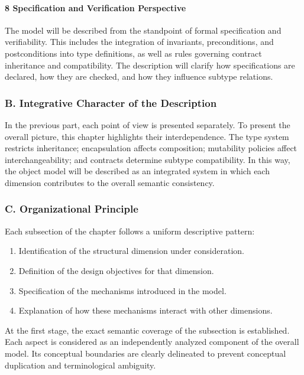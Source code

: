 \paragraph{8 Specification and Verification Perspective}

The model will be described from the standpoint of formal specification and verifiability. This includes the integration of invariants, preconditions, and postconditions into type definitions, as well as rules governing contract inheritance and compatibility. The description will clarify how specifications are declared, how they are checked, and how they influence subtype relations. 

\subsubsection{B. Integrative Character of the Description}

In the previous part, each point of view is presented separately. To present the overall picture, this chapter highlights their interdependence. The type system restricts inheritance; encapsulation affects composition; mutability policies affect interchangeability; and contracts determine subtype compatibility. In this way, the object model will be described as an integrated system in which each dimension contributes to the overall semantic consistency.

\subsubsection{C. Organizational Principle}

Each subsection of the chapter follows a uniform descriptive pattern:

\begin{enumerate}
    \item Identification of the structural dimension under consideration.
    \item Definition of the design objectives for that dimension.
    \item Specification of the mechanisms introduced in the model.
    \item Explanation of how these mechanisms interact with other dimensions.
\end{enumerate}

At the first stage, the exact semantic coverage of the subsection is established. Each aspect is considered as an independently analyzed component of the overall model. Its conceptual boundaries are clearly delineated to prevent conceptual duplication and terminological ambiguity. 


